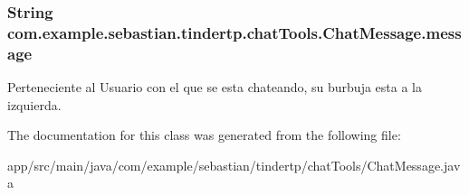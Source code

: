 \subsubsection[{\texorpdfstring{message}{message}}]{\setlength{\rightskip}{0pt plus 5cm}String com.\+example.\+sebastian.\+tindertp.\+chat\+Tools.\+Chat\+Message.\+message}\hypertarget{classcom_1_1example_1_1sebastian_1_1tindertp_1_1chatTools_1_1ChatMessage_aee5e1e99652c0f954aec7f99975c2714}{}\label{classcom_1_1example_1_1sebastian_1_1tindertp_1_1chatTools_1_1ChatMessage_aee5e1e99652c0f954aec7f99975c2714}
Perteneciente al Usuario con el que se esta chateando, su burbuja esta a la izquierda. 

The documentation for this class was generated from the following file\+:\begin{DoxyCompactItemize}
\item 
app/src/main/java/com/example/sebastian/tindertp/chat\+Tools/Chat\+Message.\+java\end{DoxyCompactItemize}
